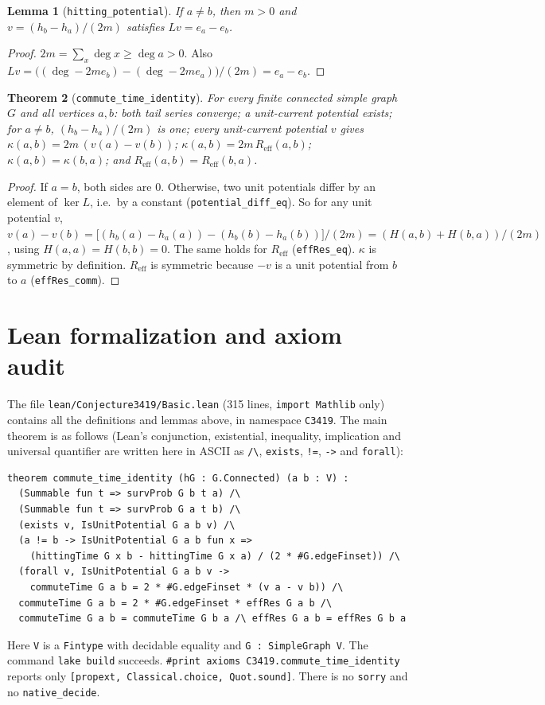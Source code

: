 \documentclass[11pt]{article}
\newtheorem{theorem}{Theorem}
\newtheorem{lemma}[theorem]{Lemma}
\theoremstyle{definition}
\newcommand{\Reff}{R_{\mathrm{eff}}}
\begin{document}
\begin{lemma}[\texttt{hitting\_potential}]\label{lem:pot}
If $a\ne b$, then $m>0$ and $v=(h_b-h_a)/(2m)$ satisfies $Lv=e_a-e_b$.
\end{lemma}
\begin{proof}
$2m=\sum_x\deg x\ge\deg a>0$. Also $Lv=\big((\deg-2m e_b)-(\deg-2m e_a)\big)/(2m)=e_a-e_b$.
\end{proof}

\begin{theorem}[\texttt{commute\_time\_identity}]
For every finite connected simple graph $G$ and all vertices $a,b$:
both tail series converge; a unit-current potential exists; for $a\ne b$,
$(h_b-h_a)/(2m)$ is one; every unit-current potential $v$ gives $\kappa(a,b)=2m\,(v(a)-v(b))$;
$\kappa(a,b)=2m\,\Reff(a,b)$; $\kappa(a,b)=\kappa(b,a)$; and $\Reff(a,b)=\Reff(b,a)$.
\end{theorem}
\begin{proof}
If $a=b$, both sides are $0$. Otherwise, two unit potentials differ by an element of $\ker L$,
i.e.\ by a constant (\texttt{potential\_diff\_eq}). So for any unit potential $v$,
$v(a)-v(b)=\big[(h_b(a)-h_a(a))-(h_b(b)-h_a(b))\big]/(2m)=(H(a,b)+H(b,a))/(2m)$, using
$H(a,a)=H(b,b)=0$. The same holds for $\Reff$ (\texttt{effRes\_eq}). $\kappa$ is symmetric by
definition. $\Reff$ is symmetric because $-v$ is a unit potential from $b$ to $a$
(\texttt{effRes\_comm}).
\end{proof}

\section{Lean formalization and axiom audit}

The file \texttt{lean/Conjecture3419/Basic.lean} (315 lines, \texttt{import Mathlib} only) contains
all the definitions and lemmas above, in namespace \texttt{C3419}. The main theorem is as follows
(Lean's conjunction, existential, inequality, implication and universal quantifier are written here
in ASCII as \verb|/\|, \verb|exists|, \verb|!=|, \verb|->| and \verb|forall|):
\begin{verbatim}
theorem commute_time_identity (hG : G.Connected) (a b : V) :
  (Summable fun t => survProb G b t a) /\
  (Summable fun t => survProb G a t b) /\
  (exists v, IsUnitPotential G a b v) /\
  (a != b -> IsUnitPotential G a b fun x =>
    (hittingTime G x b - hittingTime G x a) / (2 * #G.edgeFinset)) /\
  (forall v, IsUnitPotential G a b v ->
    commuteTime G a b = 2 * #G.edgeFinset * (v a - v b)) /\
  commuteTime G a b = 2 * #G.edgeFinset * effRes G a b /\
  commuteTime G a b = commuteTime G b a /\ effRes G a b = effRes G b a
\end{verbatim}
Here \texttt{V} is a \texttt{Fintype} with decidable equality and \texttt{G : SimpleGraph V}. The
command \texttt{lake build} succeeds. \texttt{\#print axioms C3419.commute\_time\_identity} reports
only \texttt{[propext, Classical.choice, Quot.sound]}. There is no \texttt{sorry} and no
\texttt{native\_decide}.
\end{document}
